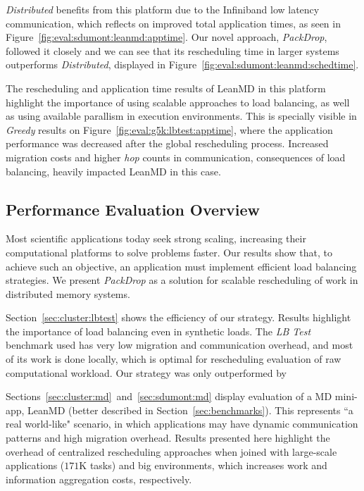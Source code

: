 \textit{Distributed} benefits from this platform due to the Infiniband low latency communication, which reflects on improved total application times, as seen in Figure~\ref{fig:eval:sdumont:leanmd:apptime}.
Our novel approach, \textit{PackDrop}, followed it closely and we can see that its rescheduling time in larger systems outperforms \textit{Distributed}, displayed in Figure~\ref{fig:eval:sdumont:leanmd:schedtime}.

The rescheduling and application time results of LeanMD in this platform highlight the importance of using scalable approaches to load balancing, as well as using available parallism in execution environments.
This is specially visible in \textit{Greedy} results on Figure~\ref{fig:eval:g5k:lbtest:apptime}, where the application performance was decreased after the global rescheduling process.
Increased migration costs and higher \textit{hop} counts in communication, consequences of load balancing, heavily impacted LeanMD in this case.

\subsection{Performance Evaluation Overview} \label{eval:overview}

Most scientific applications today seek strong scaling, increasing their computational platforms to solve problems faster.
Our results show that, to achieve such an objective, an application must implement efficient load balancing strategies.
We present \textit{PackDrop} as a solution for scalable rescheduling of work in distributed memory systems.

Section~\ref{sec:cluster:lbtest} shows the efficiency of our strategy. 
Results highlight the importance of load balancing even in synthetic loads.
The \textit{LB Test} benchmark used has very low migration and communication overhead, and most of its work is done locally, which is optimal for rescheduling evaluation of raw computational workload.
Our strategy was only outperformed by 

Sections~\ref{sec:cluster:md}~and~\ref{sec:sdumont:md} display evaluation of a MD mini-app, LeanMD (better described in Section~\ref{sec:benchmarks}).
This represents ``a real world-like" scenario, in which applications may have dynamic communication patterns and high migration overhead.
Results presented here highlight the overhead of centralized rescheduling approaches when joined with large-scale applications ($171$K tasks) and big environments, which increases work and information aggregation costs, respectively.


